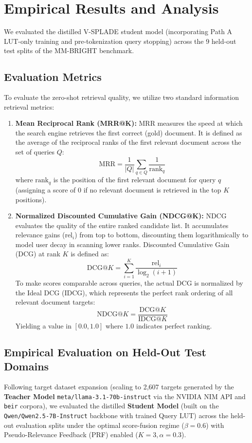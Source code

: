 \documentclass[11pt,a4paper]{article}
\begin{document}
\section{Empirical Results and Analysis}
We evaluated the distilled V-SPLADE student model (incorporating Path A LUT-only training and pre-tokenization query stopping) across the 9 held-out test splits of the MM-BRIGHT benchmark.

\subsection{Evaluation Metrics}
To evaluate the zero-shot retrieval quality, we utilize two standard information retrieval metrics:
\begin{enumerate}
    \item \textbf{Mean Reciprocal Rank (MRR@K):} MRR measures the speed at which the search engine retrieves the first correct (gold) document. It is defined as the average of the reciprocal ranks of the first relevant document across the set of queries $Q$:
    \begin{equation}
    \text{MRR} = \frac{1}{|Q|} \sum_{q \in Q} \frac{1}{\text{rank}_q}
    \end{equation}
    where $\text{rank}_q$ is the position of the first relevant document for query $q$ (assigning a score of $0$ if no relevant document is retrieved in the top $K$ positions).
    
    \item \textbf{Normalized Discounted Cumulative Gain (NDCG@K):} NDCG evaluates the quality of the entire ranked candidate list. It accumulates relevance gains ($\text{rel}_i$) from top to bottom, discounting them logarithmically to model user decay in scanning lower ranks. Discounted Cumulative Gain (DCG) at rank $K$ is defined as:
    \begin{equation}
    \text{DCG}@K = \sum_{i=1}^K \frac{\text{rel}_i}{\log_2(i + 1)}
    \end{equation}
    To make scores comparable across queries, the actual DCG is normalized by the Ideal DCG (IDCG), which represents the perfect rank ordering of all relevant document targets:
    \begin{equation}
    \text{NDCG}@K = \frac{\text{DCG}@K}{\text{IDCG}@K}
    \end{equation}
    Yielding a value in $[0.0, 1.0]$ where $1.0$ indicates perfect ranking.
\end{enumerate}

\subsection{Empirical Evaluation on Held-Out Test Domains}
Following target dataset expansion (scaling to 2,607 targets generated by the \textbf{Teacher Model} \texttt{meta/llama-3.1-70b-instruct} via the NVIDIA NIM API and \texttt{beir} corpora), we evaluated the distilled \textbf{Student Model} (built on the \texttt{Qwen/Qwen2.5-7B-Instruct} backbone with trained Query LUT) across the held-out evaluation splits under the optimal score-fusion regime ($\beta=0.6$) with Pseudo-Relevance Feedback (PRF) enabled ($K=3, \alpha=0.3$).
\end{document}
